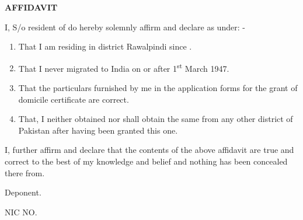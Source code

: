 \documentclass{article}
\begin{document}
\begin{center}
\textbf{\Large AFFIDAVIT}
\end{center}

I, \underline{\hspace{5cm}} S/o \underline{\hspace{5cm}} resident of \underline{\hspace{5cm}} do hereby solemnly affirm and declare as under: -

\begin{enumerate}
    \item That I am residing in district Rawalpindi since \underline{\hspace{5cm}}.
    \item That I never migrated to India on or after 1\textsuperscript{st} March 1947.
    \item That the particulars furnished by me in the application forms for the grant of domicile certificate are correct.
    \item That, I neither obtained nor shall obtain the same from any other district of Pakistan after having been granted this one.
\end{enumerate}

I, further affirm and declare that the contents of the above affidavit are true and correct to the best of my knowledge and belief and nothing has been concealed there from.

\vspace{1cm}

Deponent. \underline{\hspace{5cm}}

NIC NO. \underline{\hspace{5cm}}
\end{document}
